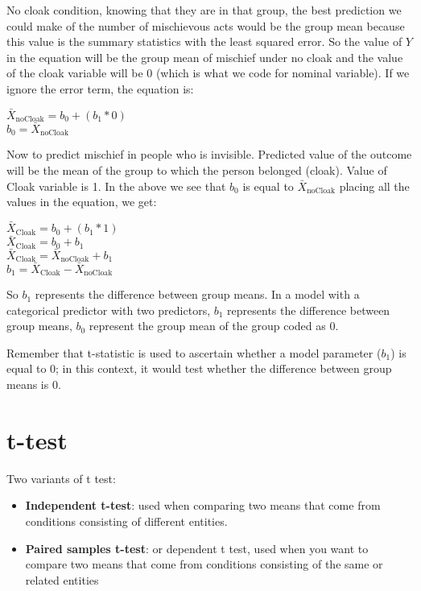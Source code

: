 No cloak condition, knowing that they are in that group, the best prediction we could make of the number of mischievous acts would be the group mean because this value is the summary statistics with the least squared error. So the value of $Y$ in the equation will be the group mean of mischief under no cloak and the value of the cloak variable will be 0 (which is what we code for nominal variable). If we ignore the error term, the equation is: 
\begin{center}
$\bar{X}_{\text{noCloak}} = b_0 + (b_{1} * 0 )$\\
$b_0 = \bar{X}_{\text{noCloak}}$
\end{center}

Now to predict mischief in people who is invisible. Predicted value of the outcome will be the mean of the group to which the person belonged (cloak). Value of Cloak variable is 1. In the above we see that $b_0$ is equal to $\bar{X}_{\text{noCloak}}$ placing all the values in the equation, we get: 

\begin{center}
$\bar{X}_{\text{Cloak}} = b_0 + (b_{1} * 1)$\\
$\bar{X}_{\text{Cloak}} = b_0 + b_1$ \\
$\bar{X}_{\text{Cloak}} =\bar{X}_{\text{noCloak}} + b_1$ \\
$b_1 = \bar{X}_{\text{Cloak}} - \bar{X}_{\text{noCloak}} $
\end{center}

So $b_1$ represents the difference between group means. In a model with a categorical predictor with two predictors, $b_1$ represents the difference between group means, $b_0$ represent the group mean of the group coded as 0.

Remember that t-statistic is used to ascertain whether a model parameter ($b_1$) is equal to 0; in this context, it would test whether the difference between group means is 0.
\section{t-test}

Two variants of t test:
\begin{itemize}
\item \textbf{Independent t-test}: used when comparing two means that come from conditions consisting of different entities.
\item \textbf{Paired samples t-test}: or dependent t test, used when you want to compare two means that come from conditions consisting of the same or related entities
\end{itemize}
